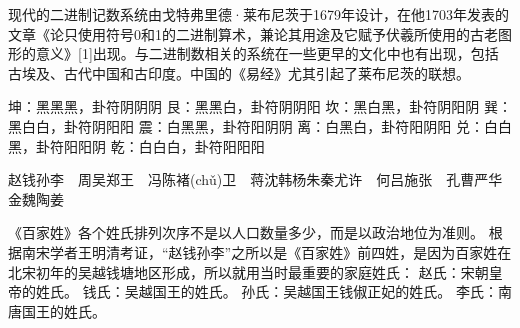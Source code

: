 \documentclass[main.tex]{subfiles}
\begin{document}
现代的二进制记数系统由戈特弗里德·莱布尼茨于1679年设计，在他1703年发表的文章《论只使用符号0和1的二进制算术，兼论其用途及它赋予伏羲所使用的古老图形的意义》[1]出现。与二进制数相关的系统在一些更早的文化中也有出现，包括古埃及、古代中国和古印度。中国的《易经》尤其引起了莱布尼茨的联想。

坤：黑黑黑，卦符阴阴阴
艮：黑黑白，卦符阴阴阳
坎：黑白黑，卦符阴阳阴
巽：黑白白，卦符阴阳阳
震：白黑黑，卦符阳阴阴
离：白黑白，卦符阳阴阳
兑：白白黑，卦符阳阳阴
乾：白白白，卦符阳阳阳

赵钱孙李　周吴郑王　冯陈褚(chǔ)卫　蒋沈韩杨朱秦尤许　何吕施张　孔曹严华　金魏陶姜

《百家姓》各个姓氏排列次序不是以人口数量多少，而是以政治地位为准则。
根据南宋学者王明清考证，“赵钱孙李”之所以是《百家姓》前四姓，是因为百家姓在北宋初年的吴越钱塘地区形成，所以就用当时最重要的家庭姓氏：
赵氏：宋朝皇帝的姓氏。
钱氏：吴越国王的姓氏。
孙氏：吴越国王钱俶正妃的姓氏。
李氏：南唐国王的姓氏。
\end{document}
